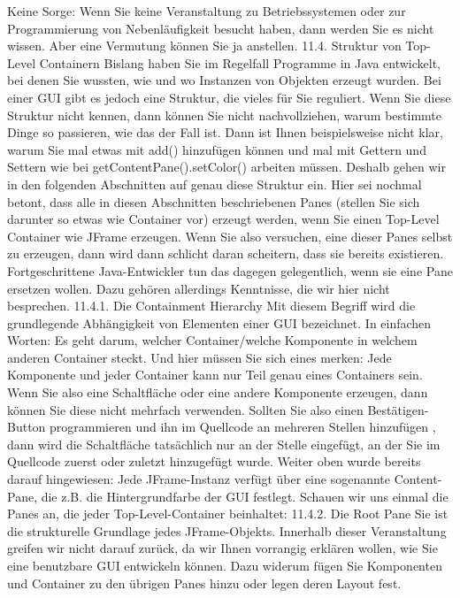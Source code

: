 Keine Sorge: Wenn Sie keine Veranstaltung zu Betriebssystemen oder zur Programmierung von Nebenläufigkeit besucht haben, dann werden Sie es nicht wissen. Aber eine Vermutung können Sie ja anstellen.
11.4.	Struktur von Top-Level Containern
Bislang haben Sie im Regelfall Programme in Java entwickelt, bei denen Sie wussten, wie und wo Instanzen von Objekten erzeugt wurden. Bei einer GUI gibt es jedoch eine Struktur, die vieles für Sie reguliert. Wenn Sie diese Struktur nicht kennen, dann können Sie nicht nachvollziehen, warum bestimmte Dinge so passieren, wie das der Fall ist. Dann ist Ihnen beispielsweise nicht klar, warum Sie mal etwas mit add() hinzufügen können und mal mit Gettern und Settern wie bei getContentPane().setColor() arbeiten müssen. Deshalb gehen wir in den folgenden Abschnitten auf genau diese Struktur ein.
Hier sei nochmal betont, dass alle in diesen Abschnitten beschriebenen Panes (stellen Sie sich darunter so etwas wie Container vor) erzeugt werden, wenn Sie einen Top-Level Container wie JFrame erzeugen. Wenn Sie also versuchen, eine dieser Panes selbst zu erzeugen, dann wird dann schlicht daran scheitern, dass sie bereits existieren. Fortgeschrittene Java-Entwickler tun das dagegen gelegentlich, wenn sie eine Pane ersetzen wollen. Dazu gehören allerdings Kenntnisse, die wir hier nicht besprechen.
11.4.1.	Die Containment Hierarchy
Mit diesem Begriff wird die grundlegende Abhängigkeit von Elementen einer GUI bezeichnet. In einfachen Worten: Es geht darum, welcher Container/welche Komponente in welchem anderen Container steckt.
Und hier müssen Sie sich eines merken: Jede Komponente und jeder Container kann nur Teil genau eines Containers sein. Wenn Sie also eine Schaltfläche oder eine andere Komponente erzeugen, dann können Sie diese nicht mehrfach verwenden. Sollten Sie also einen Bestätigen-Button programmieren und ihn im Quellcode an mehreren Stellen hinzufügen , dann wird die Schaltfläche tatsächlich nur an der Stelle eingefügt, an der Sie im Quellcode zuerst oder zuletzt hinzugefügt wurde.
Weiter oben wurde bereits darauf hingewiesen: Jede JFrame-Instanz verfügt über eine sogenannte Content-Pane, die z.B. die Hintergrundfarbe der GUI festlegt. Schauen wir uns einmal die Panes an, die jeder Top-Level-Container beinhaltet:
11.4.2.	Die Root Pane
Sie ist die strukturelle Grundlage jedes JFrame-Objekts. Innerhalb dieser Veranstaltung greifen wir nicht darauf zurück, da wir Ihnen vorrangig erklären wollen, wie Sie eine benutzbare GUI entwickeln können. Dazu widerum fügen Sie Komponenten und Container zu den übrigen Panes hinzu oder legen deren Layout fest. 
